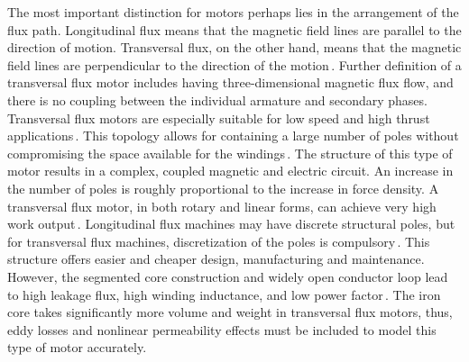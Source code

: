         
        The most important distinction for motors perhaps lies in the arrangement of the flux path. Longitudinal flux means that the magnetic field lines are parallel to the direction of motion. Transversal flux, on the other hand, means that the magnetic field lines are perpendicular to the direction of the motion\,\cite{Laithwaite1975LinearView}. Further definition of a transversal flux motor includes having three-dimensional magnetic flux flow, and there is no coupling between the individual armature and secondary phases. Transversal flux motors are especially suitable for low speed and high thrust applications\,\cite{Zhao2015,Shin2015}. This topology allows for containing a large number of poles without compromising the space available for the windings\,\cite{Laithwaite1971}. The structure of this type of motor results in a complex, coupled magnetic and electric circuit. An increase in the number of poles is roughly proportional to the increase in force density. A transversal flux motor, in both rotary and linear forms, can achieve very high work output\,\cite{Ueda2014SmallCondition,Hsu2011DevelopmentMotor,Wang2016OptimalApplications,Arshad2001,Siatkowski2008}. Longitudinal flux machines may have discrete structural poles, but for transversal flux machines, discretization of the poles is compulsory\,\cite{Baoming2009DesignMotor}. This structure offers easier and cheaper design, manufacturing and maintenance. However, the segmented core construction and widely open conductor loop lead to high leakage flux, high winding inductance, and low power factor\,\cite{Harris1997ComparisonMachines,Lu2003ModelingMachine}. The iron core takes significantly more volume and weight in transversal flux motors, thus, eddy losses and nonlinear permeability effects must be included to model this type of motor accurately.
        
